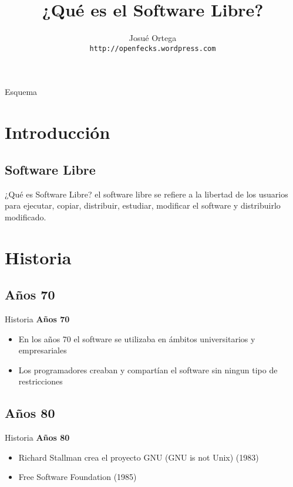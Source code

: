 \documentclass{beamer}
\title{¿Qu\'e es el Software Libre?}
\author[noahfx]{Josu\'e Ortega \\ \texttt{http://openfecks.wordpress.com}}
\institute{SSL 20 - Lugusac}
\begin{document}
\begin{frame}
	\titlepage
\end{frame}

\begin{frame}{Esquema}
	\tableofcontents
\end{frame}

\section{Introducci\'on}
\subsection{Software Libre}
\begin{frame}
	  \centering
	  \alert ¿Qu\'e es Software Libre?
	  \pause
	   el software libre se refiere a la libertad de los usuarios para ejecutar, copiar, distribuir, 
	    estudiar, modificar el software y distribuirlo modificado. 
\end{frame}


\section{Historia}

\subsection{A\~nos 70}
\begin{frame}{Historia}
  \centering
     \alert {\bf A\~nos 70}
      \begin{itemize}
	\item En los a\~nos 70 el software se utilizaba en \'ambitos universitarios y empresariales
	\pause
	\item Los programadores creaban y compart\'ian el software sin ningun tipo de restricciones
      \end{itemize}
 \end{frame}


\subsection{A\~nos 80}
\begin{frame}{Historia}
	  \centering	 
	  \alert {\bf A\~nos 80}
	  \begin{itemize}
		\item Richard Stallman crea el proyecto GNU (GNU is not Unix) (1983)
		\pause
		\item Free Software Foundation (1985)		
	  \end{itemize}
\end{frame}
\end{document}
